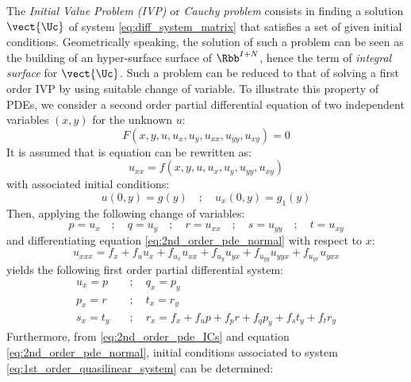 The \textit{Initial Value Problem (IVP)} or \textit{Cauchy problem} consists in finding a solution $\vect{\Uc}$ of system \ref{eq:diff_system_matrix} that satisfies a set of given initial conditions. Geometrically speaking, the solution of such a problem can be seen as the building of an hyper-surface surface of $\Rbb^{I+N}$, hence the term of \textit{integral surface} for $\vect{\Uc}$. Such a problem can be reduced to that of solving a first order IVP by using suitable change of variable. To illustrate this property of PDEs, we consider a second order partial differential equation of two independent variables $(x,y)$ for the unknown $u$:
\begin{equation}
  \label{eq:2nd_order_pde}
  F(x,y,u,u_x,u_y,u_{xx},u_{yy},u_{xy})=0
\end{equation}
It is assumed that is equation can be rewritten as:
\begin{equation}
  \label{eq:2nd_order_pde_normal}
  u_{xx}= f(x,y,u,u_x,u_y,u_{yy},u_{xy})
\end{equation}
with associated initial conditions:
\begin{equation}
  \label{eq:2nd_order_pde_ICs}
  u(0,y)= g(y) \quad ; \quad u_x(0,y)= g_1(y)
\end{equation}
Then, applying the following change of variables:
\begin{equation*}
  \label{eq:change_of_variables}
  p = u_x \quad  ; \quad   q = u_{y}  \quad   ; \quad    r = u_{xx} \quad   ; \quad  s = u_{yy} \quad;\quad   t = u_{xy} 
\end{equation*}
and differentiating equation \ref{eq:2nd_order_pde_normal} with respect to $x$:
\begin{equation*}
  \label{eq:r_x}
  u_{xxx}= f_x + f_u u_x + f_{u_x}u_{xx} + f_{u_y}u_{yx} + f_{u_{yy}}u_{yyx}+f_{u_{yx}}u_{yxx}
\end{equation*}
yields the following first order partial differential system:
\begin{equation}
  \label{eq:1st_order_quasilinear_system}
  \begin{aligned}
    u_x  = p \quad & ; \quad    q_x  = p_y \\
    p_x  = r \quad &;\quad     t_x  = r_y \\
    s_x  = t_y \quad &;\quad   r_x  = f_x + f_up + f_p r + f_q p_y + f_s t_y + f_t r_y
  \end{aligned}
\end{equation}
Furthermore, from \ref{eq:2nd_order_pde_ICs} and equation \ref{eq:2nd_order_pde_normal}, initial conditions associated to system \ref{eq:1st_order_quasilinear_system} can be determined:

